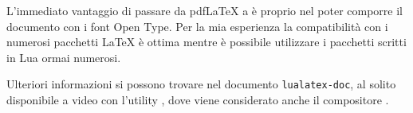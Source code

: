 L'immediato vantaggio di passare da pdf\LaTeX{} a \LuaLaTeX{} è proprio nel
poter comporre il documento con i font Open Type. Per la mia esperienza la
compatibilità con i numerosi pacchetti \LaTeX{} è ottima mentre è possibile
utilizzare i pacchetti scritti in Lua ormai numerosi.

Ulteriori informazioni si possono trovare nel documento \texttt{lualatex-doc},
al solito disponibile a video con l'utility , dove viene
considerato anche il compositore \XeLaTeX{}.

